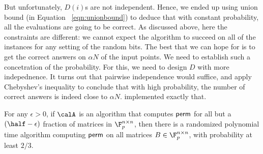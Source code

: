 But unfortunately, $D(i)$s are not independent. Hence, we ended up using union bound (in Equation ~\ref{eqn:unionbound}) to deduce that with constant probability, all the evaluations are going to be correct. As discussed above, here the constraints are different: we cannot expect the algorithm to succeed on all of the instances for any setting of the random bits. The best that we can hope for is to get the correct answers on $\alpha N$ of the input points. We need to establish such a concetration of the probability. For this, we need to design $D$ with more indepednence. It turns out that pairwise independence would suffice, and apply Chebyshev’s inequality to conclude that with high probability, the number of correct answers
is indeed close to $\alpha N$. \cite{GS92} implemented exactly that.

\begin{theorem}[\cite{GS92}]
For any $\epsilon > 0$, if $\calA$ is an algorithm that computes ${\sf perm}$ for all but a $\left(\half-\epsilon\right)$ fraction of matrices in $\F_p^{n \times n}$, 
then there is a randomized polynomial time algorithm computing ${\sf perm}$ on all matrices $B \in \F_p^{n \times n}$, with probability at least $2/3$.
\end{theorem}

